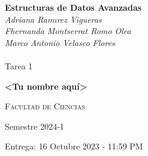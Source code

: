 \begin{titlepage}
    \begin{center}
        \vspace*{1cm}
        
        \Huge
          \textbf{Estructuras de Datos Avanzadas}
        \vspace{0.5cm}
        \small
        \\
        \textit{Adriana Ramırez Vigueras}\\
        \textit{Fhernanda Montserrat Romo Olea}\\
        \textit{Marco Antonio Velasco Flores}\\
        \\
        \vspace{0.5cm}
        \LARGE
        Tarea 1
        
        \vspace{1.5cm}
        
        \textbf{<Tu nombre aquí>} 
   		  \vspace{1.5cm}
        
        \textsc{Facultad de Ciencias} 
       
        \vfill
        
        Semestre 2024-1 
        
        \vspace{0.8cm}
          \Large
        \vspace{0.5cm}
       Entrega: 16 Octubre 2023 - 11:59 PM
        
    \end{center}
\end{titlepage}
